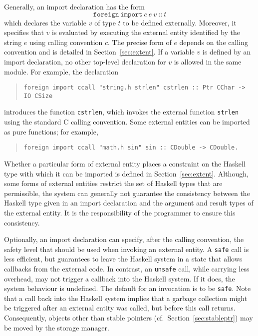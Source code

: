 \documentclass[a4paper,twosides]{article}
\newcommand{\code}[1]{\texttt{#1}}      %
\begin{document}
Generally, an import declaration has the form
%
\[
\code{foreign}~\code{import}~c~e~v~\code{{::}}~t
\]
%
which declares the variable $v$ of type $t$ to be defined externally.
Moreover, it specifies that $v$ is evaluated by executing the external entity
identified by the string $e$ using calling convention $c$.  The precise form
of $e$ depends on the calling convention and is detailed in
Section~\ref{sec:extent}.  If a variable $v$ is defined by an import
declaration, no other top-level declaration for $v$ is allowed in the same
module.  For example, the declaration
%
\begin{quote}
\begin{verbatim}
foreign import ccall "string.h strlen" cstrlen :: Ptr CChar -> IO CSize
\end{verbatim}
\end{quote}
%
introduces the function \code{cstrlen}, which invokes the external function
\code{strlen} using the standard C calling convention.  Some external entities
can be imported as pure functions; for example,
%
\begin{quote}
\begin{verbatim}
foreign import ccall "math.h sin" sin :: CDouble -> CDouble.
\end{verbatim}
\end{quote}
%
Whether a particular form of external entity places a constraint on the
Haskell type with which it can be imported is defined in
Section~\ref{sec:extent}.  Although, some forms of external entities restrict
the set of Haskell types that are permissible, the system can generally not
guarantee the consistency between the Haskell type given in an import
declaration and the argument and result types of the external entity.  It is
the responsibility of the programmer to ensure this consistency.

Optionally, an import declaration can specify, after the calling convention,
the safety level that should be used when invoking an external entity.  A
\code{safe} call is less efficient, but guarantees to leave the Haskell system
in a state that allows callbacks from the external code.  In contrast, an
\code{unsafe} call, while carrying less overhead, may not trigger a callback
into the Haskell system.  If it does, the system behaviour is undefined.  The
default for an invocation is to be \code{safe}.  Note that a call back into
the Haskell system implies that a garbage collection might be triggered after
an external entity was called, but before this call returns.  Consequently,
objects other than stable pointers (cf.\ Section~\ref{sec:stableptr}) may be
moved by the storage manager.
\end{document}
